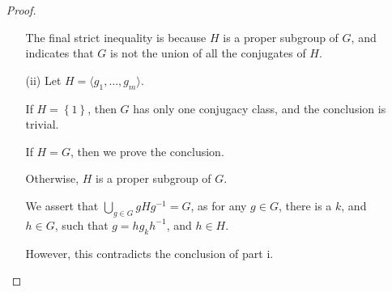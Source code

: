 \documentclass{article}
\begin{document}
\begin{enumerate}
\begin{proof}
\begin{enumerate}
                        The final strict inequality is because $H$ is a proper subgroup of $G$,
                        and indicates that $G$ is not the union of all the conjugates of $H$.
                  \item [(ii)]
                        Let $H =\langle g_{1}, \dots, g_{m} \rangle$.

                        If $H = \left\{1\right\}$, then $G$ has only one conjugacy class, and the conclusion is trivial.

                        If $H = G$, then we prove the conclusion.

                        Otherwise, $H$ is a proper subgroup of $G$.

                        We assert that $\bigcup_{g \in G} gHg^{-1} = G$,
                        as for any $g \in G$, there is a $k$, and $h \in G$,
                        such that $g = h g_{k} h^{-1}$, and $h \in H$.

                        However, this contradicts the conclusion of part i.
              \end{enumerate}
          \end{proof}
\end{enumerate}
\end{document}
